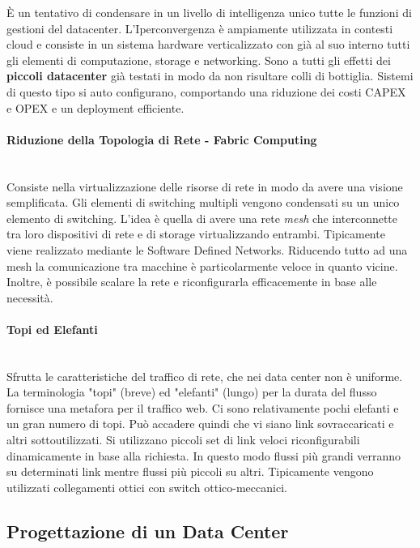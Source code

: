 \documentclass{article}
\begin{document}
		È un tentativo di condensare in un livello di intelligenza
		unico tutte le funzioni di gestioni del datacenter.
		L'Iperconvergenza è ampiamente utilizzata in contesti cloud e
		consiste in un sistema hardware verticalizzato con già al suo interno tutti
		gli elementi di computazione, storage e
		networking. Sono a tutti gli effetti dei \textbf{piccoli
		datacenter} già testati in modo da non risultare
		colli di bottiglia. Sistemi di questo tipo si
		auto configurano, comportando una riduzione dei costi
		CAPEX e OPEX e un deployment efficiente.
		
		\paragraph{Riduzione della Topologia di Rete - Fabric Computing}\label{riduzione-della-topologia-di-rete}\mbox{}\\
		Consiste nella virtualizzazione delle risorse di rete in modo
		da avere una visione semplificata. Gli elementi di
		switching multipli vengono condensati su un unico
		elemento di switching. L'idea è quella di avere una rete \textit{mesh}
		che interconnette tra loro dispositivi di rete e
		di storage virtualizzando entrambi. Tipicamente viene realizzato mediante le Software Defined Networks. Riducendo tutto ad una mesh la comunicazione tra macchine è particolarmente veloce in quanto vicine. Inoltre, è possibile scalare la rete e riconfigurarla efficacemente in base alle necessità.

		\paragraph{Topi ed Elefanti}\label{topi-e-elefanti}\mbox{}\\
		Sfrutta le caratteristiche del traffico di rete, che nei data center non è uniforme. 
		La terminologia "topi" (breve) ed "elefanti" (lungo) per la durata del flusso fornisce una metafora per il traffico web. Ci sono relativamente pochi elefanti e un gran numero di topi.
		Può accadere quindi che vi siano link sovraccaricati e altri sottoutilizzati.
		Si utilizzano piccoli set di link veloci riconfigurabili dinamicamente in base alla richiesta. In questo modo flussi più grandi verranno su determinati link mentre flussi più piccoli su altri.
		Tipicamente vengono utilizzati collegamenti ottici con switch ottico-meccanici.
		
		\subsection{Progettazione di un Data Center}\label{progettazione-di-un-data-center}
\end{document}
